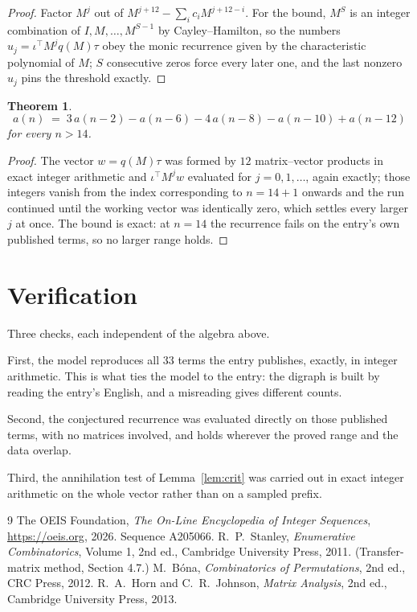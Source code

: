 \documentclass[11pt,a4paper]{article}
\theoremstyle{plain}
\newtheorem{theorem}{Theorem}
\theoremstyle{definition}
\begin{document}
\begin{proof}
Factor $M^{j}$ out of $M^{j+12}-\sum_ic_iM^{j+12-i}$. For the bound, $M^{S}$
is an integer combination of $I,M,\dots,M^{S-1}$ by Cayley--Hamilton, so the numbers
$u_j=\iota^{\!\top}M^{j}q(M)\tau$ obey the monic recurrence given by the characteristic
polynomial of $M$; $S$ consecutive zeros force every later one, and the last nonzero $u_j$
pins the threshold exactly.
\end{proof}

\begin{theorem}
\[
a(n)\;=\;3\,a(n-2) - a(n-6) - 4\,a(n-8) - a(n-10) + a(n-12)
\]
for every $n>14$.
\end{theorem}

\begin{proof}
The vector $w=q(M)\tau$ was formed by $12$ matrix--vector products in exact integer
arithmetic and $\iota^{\!\top}M^{j}w$ evaluated for $j=0,1,\dots$, again exactly; those
integers vanish from the index corresponding to $n=14+1$ onwards and the run continued
until the working vector was identically zero, which settles every larger $j$ at once. The bound is exact: at $n=14$ the recurrence fails on the entry's own published terms, so no larger range holds.
\end{proof}

\section{Verification}

Three checks, each independent of the algebra above.

First, the model reproduces all $33$ terms the entry publishes, exactly, in integer
arithmetic. This is what ties the model to the entry: the digraph is built by reading the
entry's English, and a misreading gives different counts.

Second, the conjectured recurrence was evaluated directly on those published terms, with no
matrices involved, and holds wherever the proved range and the data overlap.

Third, the annihilation test of Lemma~\ref{lem:crit} was carried out in exact integer
arithmetic on the whole vector rather than on a sampled prefix.

\begin{thebibliography}{9}
 The OEIS Foundation, \emph{The On-Line Encyclopedia of Integer
Sequences}, \url{https://oeis.org}, 2026. Sequence A205066.
 R.~P.~Stanley, \emph{Enumerative Combinatorics}, Volume 1, 2nd ed.,
Cambridge University Press, 2011. (Transfer-matrix method, Section 4.7.)
 M.~B\'ona, \emph{Combinatorics of Permutations}, 2nd ed., CRC
Press, 2012.
 R.~A.~Horn and C.~R.~Johnson, \emph{Matrix Analysis}, 2nd ed., Cambridge
University Press, 2013.
\end{thebibliography}
\end{document}

